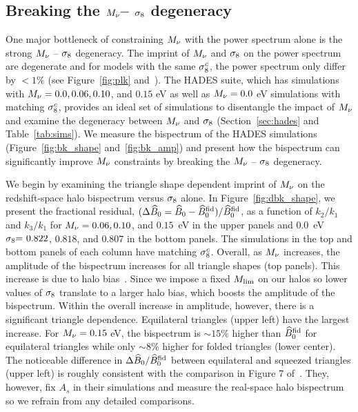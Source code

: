 \subsection{Breaking the $M_\nu$-- $\sigma_8$ degeneracy} \label{sec:mnusig}
One major bottleneck of constraining $M_\nu$ with the power spectrum alone is the 
strong $M_\nu$ -- $\sigma_8$ degeneracy. The imprint of $M_\nu$ and $\sigma_8$ on the power 
spectrum are degenerate and for models with the same $\sigma_8^c$, the power spectrum
only differ by $< 1\%$ (see Figure~\ref{fig:plk} and~\citealt{villaescusa-navarro2018}). 
The HADES suite, which has simulations with $M_\nu = 0.0, 0.06, 0.10$, 
and $0.15$ eV as well as $M_\nu = 0.0$ eV simulations with matching $\sigma_8^{c}$, 
provides an ideal set of simulations to disentangle the impact of $M_\nu$ and 
examine the degeneracy between $M_\nu$ and $\sigma_8$ (Section~\ref{sec:hades} and Table~\ref{tab:sims}). 
We measure the bispectrum of the HADES simulations (Figure~\ref{fig:bk_shape} and~\ref{fig:bk_amp}) 
and present how the bispectrum can significantly improve $M_\nu$ constraints 
by breaking the $M_\nu$ -- $\sigma_8$ degeneracy. 

We begin by examining the triangle shape dependent imprint of $M_\nu$ on the 
redshift-space halo bispectrum versus $\sigma_8$ alone. In Figure~\ref{fig:dbk_shape}, 
we present the fractional residual, $(\Delta \widehat{B}_0 = \widehat{B}_0 - \widehat{B}_0^{\rm fid})/\widehat{B}_0^{\rm fid}$,
as a function of $k_2/k_1$ and $k_3/k_1$ for $M_\nu=0.06, 0.10$, and $0.15$~eV 
in the upper panels and 0.0~eV $\sigma_8{=}~0.822$, $0.818$, and $0.807$ in the 
bottom panels. The simulations in the top and bottom panels of each column 
have matching $\sigma_8^{c}$. Overall, as $M_\nu$ increases, the amplitude of the 
bispectrum increases for all triangle shapes (top panels). This increase is due to halo 
bias~\citep[][see also Figure~\ref{fig:plk}]{villaescusa-navarro2018}. Since we 
impose a fixed $M_{\rm lim}$ on our halos so lower values of $\sigma_8$ translate 
to a larger halo bias, which boosts the amplitude of the bispectrum. Within the 
overall increase in amplitude, however, there is a significant triangle dependence. 
Equilateral triangles (upper left) have the largest increase. For $M_\nu=0.15$ eV, 
the bispectrum is $\sim 15\%$ higher than $\widehat{B}_0^{\rm fid}$ for equilateral triangles 
while only $\sim 8\%$ higher for folded triangles (lower center). The noticeable 
difference in $\Delta \widehat{B}_0/\widehat{B}_0^{\rm fid}$ between equilateral and squeezed 
triangles (upper left) is roughly consistent with the comparison in Figure 7 
of~\cite{ruggeri2018}. They, however, fix $A_s$ in their simulations and 
measure the real-space halo bispectrum so we refrain from any detailed 
comparisons. 

